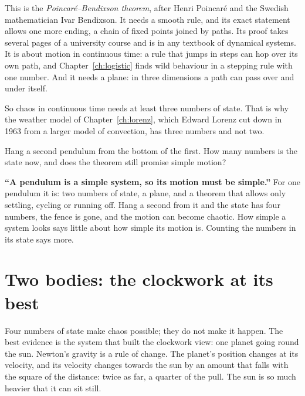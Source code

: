 \begin{rigourbox}
This is the \emph{Poincaré--Bendixson theorem}, after Henri Poincaré and the
Swedish mathematician Ivar Bendixson. It needs a smooth rule, and its exact
statement allows one more ending, a chain of fixed points joined by paths.
Its proof takes several pages of a university course and is in any textbook
of dynamical systems. It is about motion in continuous time: a rule that
jumps in steps can hop over its own path, and Chapter~\ref{ch:logistic} finds
wild behaviour in a stepping rule with one number. And it needs a plane: in
three dimensions a path can pass over and under itself.
\end{rigourbox}

\noindent
So chaos in continuous time needs at least three numbers of state. That is
why the weather model of Chapter~\ref{ch:lorenz}, which Edward Lorenz cut down
in 1963 from a larger model of convection, has three numbers and not two.

\begin{think}
Hang a second pendulum from the bottom of the first. How many numbers is the
state now, and does the theorem still promise simple motion?
\end{think}

\begin{trapbox}
\textbf{\enquote{A pendulum is a simple system, so its motion must be
simple.}} For one pendulum it is: two numbers of state, a plane, and a
theorem that allows only settling, cycling or running off. Hang a second from
it and the state has four numbers, the fence is gone, and the motion can
become chaotic. How simple a system looks says little about how simple its
motion is. Counting the numbers in its state says more.
\end{trapbox}

\section{Two bodies: the clockwork at its best}
\label{sec:ch04-planets}

\noindent
Four numbers of state make chaos possible; they do not make it happen. The
best evidence is the system that built the clockwork view: one planet going
round the sun. Newton's gravity is a rule of change. The planet's position
changes at its velocity, and its velocity changes towards the sun by an
amount that falls with the square of the distance: twice as far, a quarter of
the pull. The sun is so much heavier that it can sit still.

